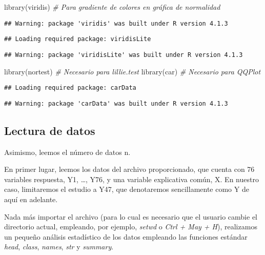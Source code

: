 \documentclass[
]{article}
\newenvironment{Shaded}{\begin{snugshade}}{\end{snugshade}}
\newcommand{\CommentTok}[1]{\textcolor[rgb]{0.56,0.35,0.01}{\textit{#1}}}
\newcommand{\FunctionTok}[1]{\textcolor[rgb]{0.00,0.00,0.00}{#1}}
\newcommand{\NormalTok}[1]{#1}
\begin{document}
\begin{Shaded}
\begin{Highlighting}[]
\FunctionTok{library}\NormalTok{(viridis)      }\CommentTok{\# Para gradiente de colores en gráfica de normalidad}
\end{Highlighting}
\end{Shaded}

\begin{verbatim}
## Warning: package 'viridis' was built under R version 4.1.3
\end{verbatim}

\begin{verbatim}
## Loading required package: viridisLite
\end{verbatim}

\begin{verbatim}
## Warning: package 'viridisLite' was built under R version 4.1.3
\end{verbatim}

\begin{Shaded}
\begin{Highlighting}[]
\FunctionTok{library}\NormalTok{(nortest)      }\CommentTok{\# Necesario para lillie.test}
\FunctionTok{library}\NormalTok{(car)          }\CommentTok{\# Necesario para QQPlot}
\end{Highlighting}
\end{Shaded}

\begin{verbatim}
## Loading required package: carData
\end{verbatim}

\begin{verbatim}
## Warning: package 'carData' was built under R version 4.1.3
\end{verbatim}

\hypertarget{lectura-de-datos}{%
\subsection{Lectura de datos}\label{lectura-de-datos}}

Asimismo, leemos el número de datos n.

En primer lugar, leemos los datos del archivo proporcionado, que cuenta
con 76 variables respuesta, Y1, \ldots, Y76, y una variable explicativa
común, X. En nuestro caso, limitaremos el estudio a Y47, que denotaremos
sencillamente como Y de aquí en adelante.

Nada más importar el archivo (para lo cual es necesario que el usuario
cambie el directorio actual, empleando, por ejemplo, \emph{setwd} o
\emph{Ctrl + May + H}), realizamos un pequeño análisis estadístico de
los datos empleando las funciones estándar \emph{head}, \emph{class},
\emph{names}, \emph{str} y \emph{summary}.
\end{document}
